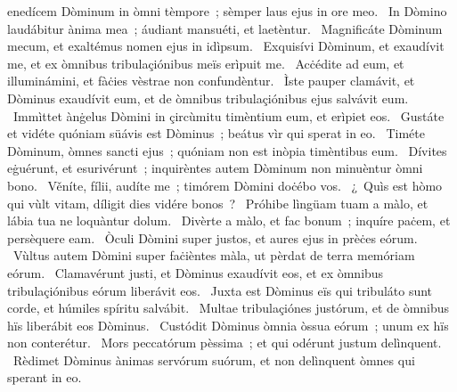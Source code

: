 { }
{%
enedícem Dòminum in òmni tèmpore~; sèmper laus ejus in ore meo. 
~In Dòmino laudábitur ànima mea~; áudiant mansuéti, et laetèntur. 
~Magnificáte Dòminum mecum, et exaltémus nomen ejus in idìpsum. 
~Exquisívi Dòminum, et exaudívit me, et ex òmnibus tribulaçiónibus meïs erìpuit me. 
~Acċédite ad eum, et illuminámini, et fàċies vèstrae non confundèntur. 
~Ìste pauper clamávit, et Dòminus exaudívit eum, et de òmnibus tribulaçiónibus ejus salvávit eum. 
~Immìttet ànġelus Dòmini in çircùmitu timèntium eum, et erìpiet eos. 
~Gustáte et vidéte quóniam süávis est Dòminus~; beátus vìr qui sperat in eo. 
~Timéte Dòminum, òmnes sancti ejus~; quóniam non est inòpia timèntibus eum. 
~Dívites eġuérunt, et esurivérunt~; inquirèntes autem Dòminum non minuèntur òmni bono. 
~Věníte, fílii, audíte me~; timórem Dòmini doċébo vos. 
~¿~Quìs est hòmo qui vùlt vitam, díligit dies vidére bonos~? 
~Próhibe lìngüam tuam a màlo, et lábia tua ne loquàntur dolum. 
~Divèrte a màlo, et fac bonum~; inquíre paċem, et persèquere eam. 
~Òculi Dòmini super justos, et aures ejus in prèċes eórum. 
~Vùltus autem Dòmini super faċièntes màla, ut pèrdat de terra memóriam eórum. 
~Clamavérunt justi, et Dòminus exaudívit eos, et ex òmnibus tribulaçiónibus eórum liberávit eos. 
~Juxta est Dòminus eïs qui tribuláto sunt corde, et húmiles spíritu salvábit. 
~Multae tribulaçiónes justórum, et de òmnibus hïs liberábit eos Dòminus. 
~Custódit Dòminus òmnia òssua eórum~; unum ex hïs non conterétur. 
~Mors peccatórum pèssima~; et qui odérunt justum delìnquent. 
~Rèdimet Dòminus ànimas servórum suórum, et non delìnquent òmnes qui sperant in eo. 
}
